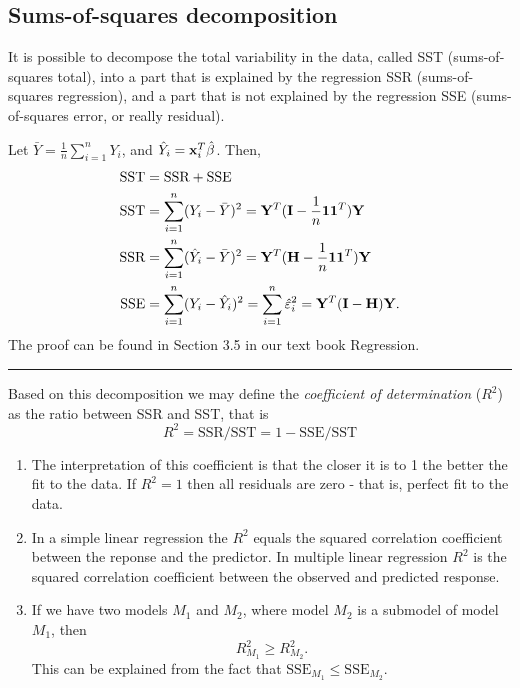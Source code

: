 \documentclass[
]{article}
\providecommand{\tightlist}{%
  \setlength{\itemsep}{0pt}\setlength{\parskip}{0pt}}
\begin{document}
\hypertarget{sums-of-squares-decomposition}{%
\subsection{Sums-of-squares
decomposition}\label{sums-of-squares-decomposition}}

It is possible to decompose the total variability in the data, called
SST (sums-of-squares total), into a part that is explained by the
regression SSR (sums-of-squares regression), and a part that is not
explained by the regression SSE (sums-of-squares error, or really
residual).

Let \(\bar{Y}=\frac{1}{n}\sum_{i=1}^n Y_i\), and
\(\hat{Y}_i={\bf x}_i^T\hat{\beta}\). Then, \begin{align*} 
\text{SST}&=\text{SSR}+\text{SSE}\\ 
\text{SST}&=\sum_{i=1}^n (Y_i-\bar{Y})^2={\bf Y}^T({\bf I}-\frac{1}{n}{\bf 1 1}^T){\bf Y}\\
\text{SSR}&=\sum_{i=1}^n (\hat{Y}_i-\bar{Y})^2={\bf Y}^T({\bf H}-\frac{1}{n}{\bf 1 1}^T){\bf Y}\\
\text{SSE}&=\sum_{i=1}^n (Y_i-\hat{Y}_i)^2=\sum_{i=1}^n \hat{\varepsilon}_i^2={\bf Y}^T({\bf I}-{\bf H}){\bf Y}.\\
\end{align*} The proof can be found in Section 3.5 in our text book
Regression.

\begin{center}\rule{0.5\linewidth}{0.5pt}\end{center}

Based on this decomposition we may define the \emph{coefficient of
determination} (\(R^2\)) as the ratio between SSR and SST, that is
\[R^2=\text{SSR}/\text{SST}=1-\text{SSE}/\text{SST}\]

\begin{enumerate}
\def\labelenumi{\arabic{enumi}.}
\tightlist
\item
  The interpretation of this coefficient is that the closer it is to 1
  the better the fit to the data. If \(R^2=1\) then all residuals are
  zero - that is, perfect fit to the data.
\item
  In a simple linear regression the \(R^2\) equals the squared
  correlation coefficient between the reponse and the predictor. In
  multiple linear regression \(R^2\) is the squared correlation
  coefficient between the observed and predicted response.
\item
  If we have two models \(M_1\) and \(M_2\), where model \(M_2\) is a
  submodel of model \(M_1\), then \[ R^2_{M_1}\ge R^2_{M_2}.\] This can
  be explained from the fact that
  \(\text{SSE}_{M_1}\le \text{SSE}_{M_2}\).
\end{enumerate}
\end{document}
